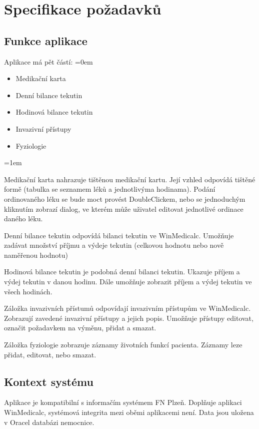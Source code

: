 \chapter{Specifikace požadavků}
\label{ch:specifikace}

\section{Funkce aplikace}

Aplikace má pět částí:
\parskip=0em
\begin{itemize}
	\item Medikační karta
	\item Denní bilance tekutin
	\item Hodinová bilance tekutin
	\item Invazivní přístupy
	\item Fyziologie
\end{itemize}
\parskip=1em

Medikační karta nahrazuje tištěnou medikační kartu. Její vzhled odpovídá tištěné formě (tabulka se seznamem léků a jednotlivýma hodinama). Podání ordinovaného léku se bude moct provést DoubleClickem, nebo se jednoduchým kliknutím zobrazí dialog, ve kterém může uživatel editovat jednotlivé ordinace daného léku.

Denní bilance tekutin odpovídá bilanci tekutin ve WinMedicalc. Umožňuje zadávat množství příjmu a výdeje tekutin (celkovou hodnotu nebo nově naměřenou hodnotu)

Hodinová bilance tekutin je podobná denní bilanci tekutin. Ukazuje příjem a výdej tekutin v danou hodinu. Dále umožňuje zobrazit příjem a výdej tekutin ve všech hodinách.

Záložka invazivních přístumů odpovídají invazivním přístupům ve WinMedicalc. Zobrazují zavedené invazivní přístupy a jejich popis. Umožňuje přístupy editovat, označit požadavkem na výměnu, přidat a smazat.

Záložka fyziologie zobrazuje záznamy životních funkcí pacienta. Záznamy leze přidat, editovat, nebo smazat.


\section{Kontext systému}

Aplikace je kompatibilní s informačím systémem FN Plzeň. Doplňuje aplikaci WinMedicalc, systémová integrita mezi oběmi aplikacemi není. Data jsou uložena v Oracel databázi nemocnice.

